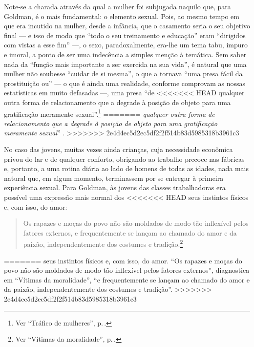 {Note-se a charada através da qual a mulher
foi subjugada naquilo que, para Goldman, é o mais fundamental: o elemento
sexual. Pois, ao mesmo tempo em que era incutido na mulher, desde a
infância, que o casamento seria o seu objetivo final --- e isso de modo
que ``todo o seu treinamento e educação'' eram ``dirigidos com vistas a
esse fim'' ---, o sexo, paradoxalmente, era-lhe um tema tabu, impuro e
imoral, a ponto de ser uma indecência a simples menção à temática. Sem
saber nada da ``função mais importante a ser exercida na sua vida'',
é natural que uma mulher não soubesse ``cuidar de si mesma'', o que a tornava ``uma presa
fácil da prostituição ou'' --- o que é ainda uma realidade, conforme
comprovam as nossas estatísticas em muito defasadas ---, uma presa ``de
<<<<<<< HEAD
qualquer outra forma de relacionamento que a degrade à posição de
objeto para uma gratificação meramente sexual''.\footnote{Ver ``Tráfico de mulheres'', p.\,\pageref{objeto}.}
=======
\textit{qualquer outra forma de relacionamento que a degrade à posição de
objeto para uma gratificação meramente sexual}'' .
>>>>>>> 2e4d4ec5d2ec5df2f2f514b83d5985318b3961c3

No caso das jovens, muitas vezes ainda crianças, cuja necessidade
econômica privou do lar e de qualquer conforto, obrigando ao trabalho
precoce nas fábricas e, portanto, a uma rotina diária ao lado de homens
de todas as idades, nada mais natural que, em algum momento, terminassem
por se entregar à primeira experiência sexual. Para Goldman, às jovens
das classes trabalhadoras era possível uma expressão mais normal dos
<<<<<<< HEAD
seus instintos físicos e, com isso, do amor:

\begin{quote}
Os rapazes e moças do povo não são moldados de modo
tão inflexível pelos fatores externos, e frequentemente se lançam ao
chamado do amor e da paixão, independentemente dos costumes e tradição.\footnote{Ver ``Vítimas da moralidade'', p.\,\pageref{tradicao}.}
\end{quote}
=======
seus instintos físicos e, com isso, do amor. ``Os rapazes e moças do
povo não são moldados de modo tão inflexível pelos fatores externos'',
diagnostica em ``Vítimas da moralidade'', ``e frequentemente se lançam
ao chamado do amor e da paixão, independentemente dos costumes e
tradição''. 
>>>>>>> 2e4d4ec5d2ec5df2f2f514b83d5985318b3961c3

}
